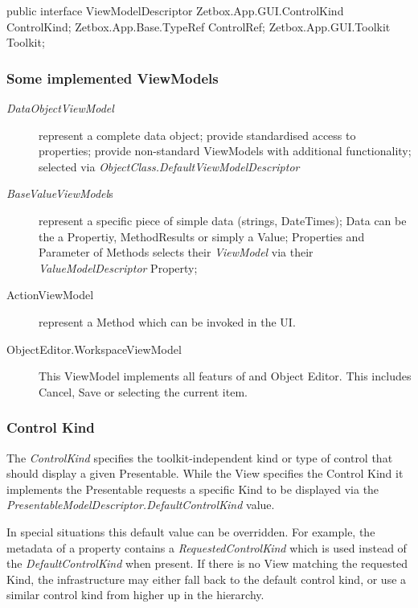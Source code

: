 \begin{CS}
public interface ViewModelDescriptor
{
	Zetbox.App.GUI.ControlKind ControlKind;
	Zetbox.App.Base.TypeRef ControlRef;
	Zetbox.App.GUI.Toolkit Toolkit;
}
\end{CS}

\subsubsection{Some implemented ViewModels}

\begin{description}

\item[\emph{DataObjectViewModel}]{represent a complete data object;
provide standardised access to properties; provide non-standard ViewModels
with additional functionality; selected via
\emph{ObjectClass.DefaultViewModelDescriptor}}

\item[\emph{BaseValueViewModel}s]{represent a specific piece of simple data (strings, DateTimes);
Data can be the a Propertiy, MethodResults or simply a Value; Properties and Parameter of Methods selects their \emph{ViewModel} via their
\emph{ValueModelDescriptor} Property; }

\item[ActionViewModel]{represent a Method which can be invoked in the UI.}

\item[ObjectEditor.WorkspaceViewModel] { This ViewModel implements all featurs of and Object Editor. This includes Cancel, Save or selecting the current item.}

\end{description} 

\subsubsection{Control Kind}

The \emph{ControlKind} specifies the toolkit-independent kind or type of
control that should display a given Presentable. While the View
specifies the Control Kind it implements the Presentable requests a
specific Kind to be displayed via the
\emph{PresentableModelDescriptor.DefaultControlKind} value.

In special situations this default value can be overridden. For example,
the metadata of a property contains a \emph{RequestedControlKind} which
is used instead of the \emph{DefaultControlKind} when present. If there
is no View matching the requested Kind, the infrastructure may either
fall back to the default control kind, or use a similar control kind
from higher up in the hierarchy.

